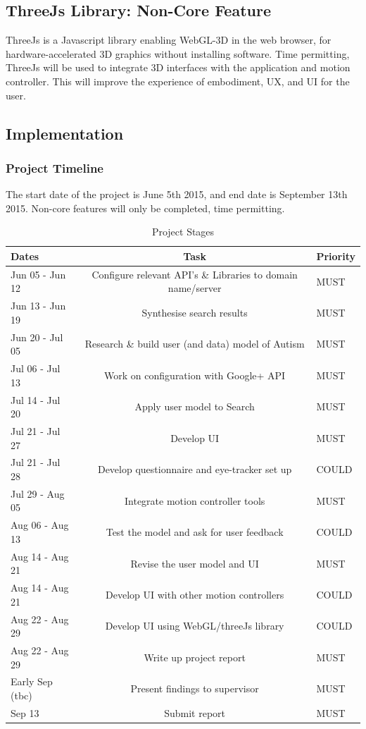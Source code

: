 \documentclass[a4paper, 10pt]{article}
\begin{document}
\subsection{ThreeJs Library: Non-Core Feature}
ThreeJs is a Javascript library enabling WebGL-3D in the web browser, for hardware-accelerated 3D graphics without installing software. Time permitting, ThreeJs will be used to integrate 3D interfaces with the application and motion controller. This will improve the experience of embodiment, UX, and UI for the user.

\subsection{Implementation}\label{plan}

\subsubsection{Project Timeline}
The start date of the project is June 5th 2015, and end date is September 13th 2015. Non-core features will only be completed, time permitting.
\begin{table}[H]
\caption{Project Stages} 
\centering
\begin{tabular}{ | L |c| L |}
\hline\hline 
Dates & Task & Priority\\ [0.5ex]
\hline 
Jun 05 - Jun 12 & Configure relevant API's \& Libraries to domain name/server & MUST\\
\hline 
Jun 13 - Jun 19 & Synthesise search results & MUST\\
\hline 
Jun 20 - Jul 05 & Research \& build user (and data) model of Autism & MUST\\
\hline 
Jul 06 - Jul 13 & Work on configuration with Google+ API & MUST\\
\hline 
Jul 14 - Jul 20 & Apply user model to Search& MUST\\ 
\hline 
Jul 21 - Jul 27 & Develop UI & MUST\\
\hline 
Jul 21 - Jul 28 & Develop questionnaire and eye-tracker set up & COULD\\
\hline 
Jul 29 - Aug 05 & Integrate motion controller tools& MUST\\
\hline 
Aug 06 - Aug 13 & Test the model and ask for user feedback & COULD\\
\hline 
Aug 14 - Aug 21 & Revise the user model and UI & MUST\\
\hline 
Aug 14 - Aug 21 & Develop UI with other motion controllers & COULD\\
\hline 
Aug 22 - Aug 29 & Develop UI using WebGL/threeJs library & COULD\\
\hline 
Aug 22 - Aug 29 & Write up project report & MUST\\ 
\hline 
Early Sep (tbc) & Present findings to supervisor & MUST\\
\hline 
Sep 13 & Submit report & MUST\\[0.5ex]
\hline
\end{tabular}
\label{stages} 
\end{table}
\end{document}
